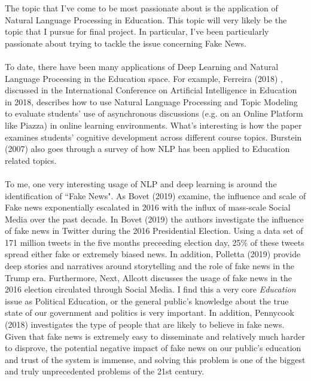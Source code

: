 \documentclass[12pt, final]{article}
\begin{document}
The topic that I've come to be most passionate about is the application of Natural Language Processing in Education. This topic will very likely be the topic that I pursue for final project. In particular, I've been particularly passionate about trying to tackle the issue concerning Fake News.
\\
\\
To date, there have been many applications of Deep Learning and Natural Language Processing in the Education space. For example, Ferreira (2018) \cite{Ferreira}, discussed in the International Conference on Artificial Intelligence in Education in 2018, describes how to use Natural Language Processing and Topic Modeling to evaluate students' use of asynchronous discussions (e.g. on an Online Platform like Piazza) in online learning environments. What's interesting is how the paper examines students' cognitive development across different course topics. Burstein (2007) \cite{Burstein} also goes through a survey of how NLP has been applied to Education related topics.
\\
\\
To me, one very interesting usage of NLP and deep learning is around the identification of ``Fake News". As Bovet (2019) \cite{Bovet} examine, the influence and scale of Fake news exponentially escalated in 2016 with the influx of mass-scale Social Media over the past decade. In Bovet (2019) \cite{Bovet} the authors investigate the influence of fake news in Twitter during the 2016 Presidential Election. Using a data set of 171 million tweets in the five months preceeding election day, 25\% of these tweets spread either fake or extremely biased news. In addition, Polletta (2019) \cite{Polletta} provide deep stories and narratives around storytelling and the role of fake news in the Trump era. Furthermore, Next,  Allcott \cite{Allcott} discusses the usage of fake news in the 2016 election circulated through Social Media. I find this a very core \textit{Education} issue as Political Education, or the general public's knowledge about the true state of our government and politics is very important. In addition, Pennycook (2018) \cite{Pennycook} investigates the type of people that are likely to believe in fake news. Given that fake news is extremely easy to disseminate and relatively much harder to disprove, the potential negative impact of fake news on our public's education and trust of the system is immense, and solving this problem is one of the biggest and truly unprecedented problems of the 21st century.
\\
\end{document}
